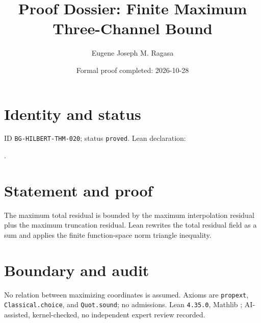 \documentclass[11pt]{article}
\title{Proof Dossier: Finite Maximum Three-Channel Bound}\author{Eugene Joseph M. Ragasa}\date{Formal proof completed: 2026-10-28}
\begin{document}
\raggedright\maketitle
\section{Identity and status}
ID \texttt{BG-HILBERT-THM-020}; status \texttt{proved}. Lean declaration:
\par{}.
\section{Statement and proof}
The maximum total residual is bounded by the maximum interpolation residual plus the maximum truncation residual. Lean rewrites the total residual field as a sum and applies the finite function-space norm triangle inequality.
\section{Boundary and audit}
No relation between maximizing coordinates is assumed. Axioms are \texttt{propext}, \texttt{Classical.choice}, and \texttt{Quot.sound}; no admissions. Lean \texttt{4.35.0}, Mathlib {\scriptsize{}}; AI-assisted, kernel-checked, no independent expert review recorded.
\end{document}
